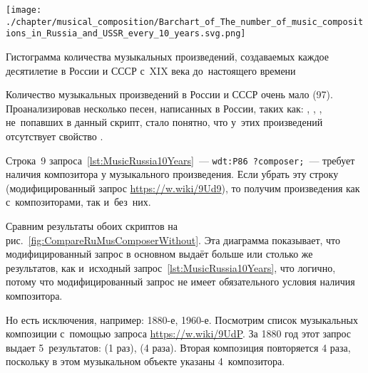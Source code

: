 \newpage

\begin{marginfigure}[0\baselineskip]
	\texttt{[image: ./chapter/musical\_composition/Barchart\_of\_The\_number\_of\_music\_compositions\_in\_Russia\_and\_USSR\_every\_10\_years.svg.png]}
    \vspace{-7pt}
	\caption{Гистограмма количества музыкальных произведений, 
             создаваемых каждое десятилетие в России и СССР с~XIX века до~настоящего времени}%
	\label{fig:diagram_10_yearsRussia}%

\end{marginfigure}

Количество музыкальных произведений в России и СССР очень мало (97). 
Проанализировав несколько песен, написанных в России, таких как: 
, 
, 
, 
не~попавших в данный скрипт, стало понятно, 
что у~этих произведений отсутствует свойство .

Строка~9 запроса~\ref{lst:MusicRussia10Years}~---  
\lstinline|wdt:P86 ?composer;|~--- 
требует наличия композитора у музыкального произведения. 
Если убрать эту строку (модифицированный запрос \href{https://w.wiki/9Ud9}
                                                     {https://w.wiki/9Ud9}), 
то получим произведения как с~композиторами, так и~без~них. 

Сравним результаты обоих скриптов на рис.~\ref{fig:CompareRuMusComposerWithout}. 
Эта диаграмма показывает, что модифицированный запрос 
в основном выдаёт больше или столько же результатов, 
как и~исходный запрос~\ref{lst:MusicRussia10Years}, 
что логично, потому что модифицированный запрос не имеет обязательного условия наличия композитора. 

Но есть исключения, например: 1880-е, 1960-е. 
Посмотрим список музыкальных композиции с~помощью запроса \href{https://w.wiki/9UdP}
                                                               {https://w.wiki/9UdP}. 
За 1880 год этот запрос выдает 5~результатов: 
 (1 раз), 
 (4 раза). 
Вторая композиция повторяется 4 раза, поскольку в этом музыкальном объекте указаны 4~композитора. 



